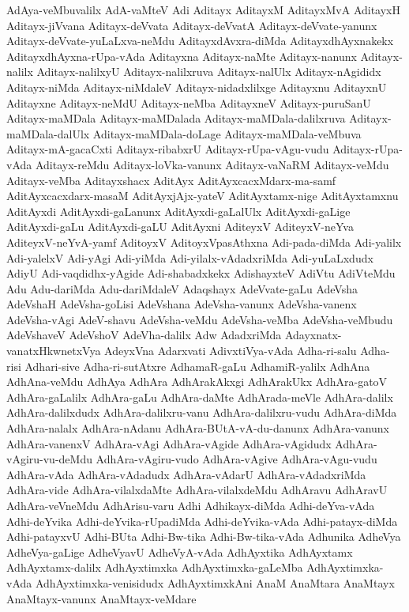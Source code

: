 {AdAya-veMbuvalilx
AdA-vaMteV
Adi
Aditayx
AditayxM
AditayxMvA
AditayxH
Aditayx-jiVvana
Aditayx-deVvata
Aditayx-deVvatA
Aditayx-deVvate-yanunx
Aditayx-deVvate-yuLaLxva-neMdu
AditayxdAvxra-diMda
AditayxdhAyxnakekx
AditayxdhAyxna-rUpa-vAda
Aditayxna
Aditayx-naMte
Aditayx-nanunx
Aditayx-nalilx
Aditayx-nalilxyU
Aditayx-nalilxruva
Aditayx-nalUlx
Aditayx-nAgididx
Aditayx-niMda
Aditayx-niMdaleV
Aditayx-nidadxlilxge
Aditayxnu
AditayxnU
Aditayxne
Aditayx-neMdU
Aditayx-neMba
AditayxneV
Aditayx-puruSanU
Aditayx-maMDala
Aditayx-maMDalada
Aditayx-maMDala-dalilxruva
Aditayx-maMDala-dalUlx
Aditayx-maMDala-doLage
Aditayx-maMDala-veMbuva
Aditayx-mA-gacaCxti
Aditayx-ribabxrU
Aditayx-rUpa-vAgu-vudu
Aditayx-rUpa-vAda
Aditayx-reMdu
Aditayx-loVka-vanunx
Aditayx-vaNaRM
Aditayx-veMdu
Aditayx-veMba
Aditayxshacx
AditAyx
AditAyxcacxMdarx-ma-samf
AditAyxcacxdarx-masaM
AditAyxjAjx-yateV
AditAyxtamx-nige
AditAyxtamxnu
AditAyxdi
AditAyxdi-gaLanunx
AditAyxdi-gaLalUlx
AditAyxdi-gaLige
AditAyxdi-gaLu
AditAyxdi-gaLU
AditAyxni
AditeyxV
AditeyxV-neYva
AditeyxV-neYvA-yamf
AditoyxV
AditoyxVpasAthxna
Adi-pada-diMda
Adi-yalilx
Adi-yalelxV
Adi-yAgi
Adi-yiMda
Adi-yilalx-vAdadxriMda
Adi-yuLaLxdudx
AdiyU
Adi-vaqdidhx-yAgide
Adi-shabadxkekx
AdishayxteV
AdiVtu
AdiVteMdu
Adu
Adu-dariMda
Adu-dariMdaleV
Adaqshayx
AdeVvate-gaLu
AdeVsha
AdeVshaH
AdeVsha-goLisi
AdeVshana
AdeVsha-vanunx
AdeVsha-vanenx
AdeVsha-vAgi
AdeV-shavu
AdeVsha-veMdu
AdeVsha-veMba
AdeVsha-veMbudu
AdeVshaveV
AdeVshoV
AdeVha-dalilx
Adw
AdadxriMda
Adayxnatx-vanatxHkwnetxVya
AdeyxVna
Adarxvati
AdivxtiVya-vAda
Adha-ri-salu
Adha-risi
Adhari-sive
Adha-ri-sutAtxre
AdhamaR-gaLu
AdhamiR-yalilx
AdhAna
AdhAna-veMdu
AdhAya
AdhAra
AdhArakAkxgi
AdhArakUkx
AdhAra-gatoV
AdhAra-gaLalilx
AdhAra-gaLu
AdhAra-daMte
AdhArada-meVle
AdhAra-dalilx
AdhAra-dalilxdudx
AdhAra-dalilxru-vanu
AdhAra-dalilxru-vudu
AdhAra-diMda
AdhAra-nalalx
AdhAra-nAdanu
AdhAra-BUtA-vA-du-danunx
AdhAra-vanunx
AdhAra-vanenxV
AdhAra-vAgi
AdhAra-vAgide
AdhAra-vAgidudx
AdhAra-vAgiru-vu-deMdu
AdhAra-vAgiru-vudo
AdhAra-vAgive
AdhAra-vAgu-vudu
AdhAra-vAda
AdhAra-vAdadudx
AdhAra-vAdarU
AdhAra-vAdadxriMda
AdhAra-vide
AdhAra-vilalxdaMte
AdhAra-vilalxdeMdu
AdhAravu
AdhAravU
AdhAra-veVneMdu
AdhArisu-varu
Adhi
Adhikayx-diMda
Adhi-deYva-vAda
Adhi-deYvika
Adhi-deYvika-rUpadiMda
Adhi-deYvika-vAda
Adhi-patayx-diMda
Adhi-patayxvU
Adhi-BUta
Adhi-Bw-tika
Adhi-Bw-tika-vAda
Adhunika
AdheVya
AdheVya-gaLige
AdheVyavU
AdheVyA-vAda
AdhAyxtika
AdhAyxtamx
AdhAyxtamx-dalilx
AdhAyxtimxka
AdhAyxtimxka-gaLeMba
AdhAyxtimxka-vAda
AdhAyxtimxka-venisidudx
AdhAyxtimxkAni
AnaM
AnaMtara
AnaMtayx
AnaMtayx-vanunx
AnaMtayx-veMdare
}
